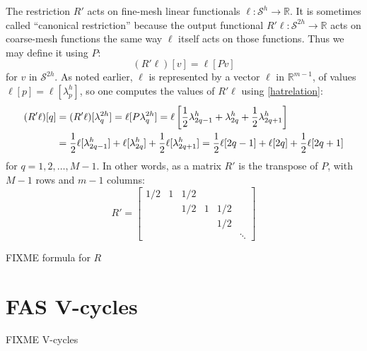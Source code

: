 \documentclass[letterpaper,final,12pt,reqno]{amsart}
\newcommand{\RR}{\mathbb{R}}
\begin{document}
The restriction $R'$ acts on fine-mesh linear functionals $\ell:\mathcal{S}^h \to \RR$.  It is sometimes called ``canonical restriction'' \cite{GraeserKornhuber2009} because the output functional $R'\ell:\mathcal{S}^{2h}\to \RR$ acts on coarse-mesh functions the same way $\ell$ itself acts on those functions.  Thus we may define it using $P$:
\begin{equation}
  (R'\ell)[v] = \ell[Pv]  \label{rprimedefinition}
\end{equation}
for $v$ in $\mathcal{S}^{2h}$.  As noted earlier, $\ell$ is represented by a vector $\bm{\ell}$ in $\RR^{m-1}$, of values $\ell[p] = \ell[\lambda_p^h]$, so one computes the values of $R'\ell$ using \eqref{hatrelation}:
\begin{align}
  (R'\ell)[q] &= (R'\ell)[\lambda_q^{2h}] = \ell[P\lambda_q^{2h}] = \ell\left[\frac{1}{2} \lambda_{2q-1}^h + \lambda_{2q}^h + \frac{1}{2} \lambda_{2q+1}^h\right]  \label{rprimeformula} \\
      &= \frac{1}{2} \ell[\lambda_{2q-1}^h] + \ell[\lambda_{2q}^h] + \frac{1}{2} \ell[\lambda_{2q+1}^h] = \frac{1}{2} \ell[2q-1] + \ell[2q] + \frac{1}{2} \ell[2q+1]  \notag
\end{align}
for $q=1,2,\dots,M-1$.  In other words, as a matrix $R'$ is the transpose of $P$, with $M-1$ rows and $m-1$ columns:
\begin{equation}
R' = \begin{bmatrix}
1/2 & 1 & 1/2 &   &     & \\
    &   & 1/2 & 1 & 1/2 & \\
    &   &     &   & 1/2 & \\
    &   &     &   &     & \ddots
\end{bmatrix} \label{rprimematrix}
\end{equation}

FIXME formula for $R$



\section{FAS V-cycles}

FIXME V-cycles

\small

\bigskip


\end{document}
